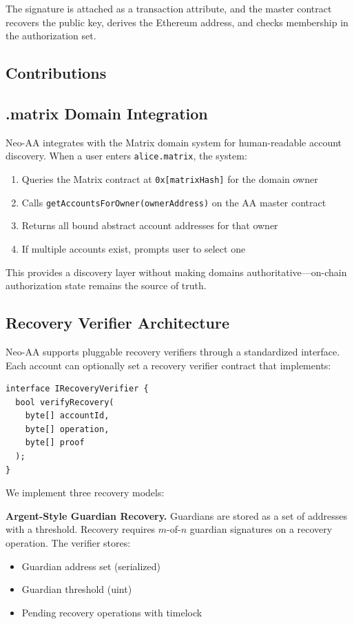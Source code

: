 \documentclass[10pt,twocolumn]{article}
\newcommand{\code}[1]{\texttt{\small #1}}
\begin{document}
The signature is attached as a transaction attribute, and the master contract recovers the public key, derives the Ethereum address, and checks membership in the authorization set.

\subsection{Contributions}

\subsection{.matrix Domain Integration}

Neo-AA integrates with the Matrix domain system for human-readable account discovery. When a user enters \code{alice.matrix}, the system:

\begin{enumerate}[leftmargin=*,topsep=2pt,itemsep=1pt]
\item Queries the Matrix contract at \code{0x[matrixHash]} for the domain owner
\item Calls \code{getAccountsForOwner(ownerAddress)} on the AA master contract
\item Returns all bound abstract account addresses for that owner
\item If multiple accounts exist, prompts user to select one
\end{enumerate}

This provides a discovery layer without making domains authoritative—on-chain authorization state remains the source of truth.

\subsection{Recovery Verifier Architecture}

Neo-AA supports pluggable recovery verifiers through a standardized interface. Each account can optionally set a recovery verifier contract that implements:

\begin{verbatim}
interface IRecoveryVerifier {
  bool verifyRecovery(
    byte[] accountId,
    byte[] operation,
    byte[] proof
  );
}
\end{verbatim}

We implement three recovery models:

\textbf{Argent-Style Guardian Recovery.} Guardians are stored as a set of addresses with a threshold. Recovery requires $m$-of-$n$ guardian signatures on a recovery operation. The verifier stores:
\begin{itemize}[leftmargin=*,topsep=2pt,itemsep=1pt]
\item Guardian address set (serialized)
\item Guardian threshold (uint)
\item Pending recovery operations with timelock
\end{itemize}
\end{document}
